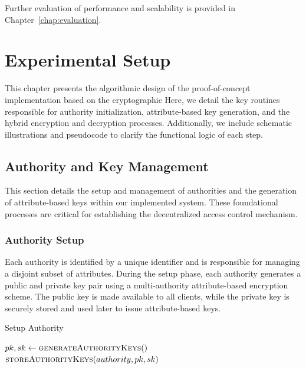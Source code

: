 \documentclass[cic,tc,english]{iiufrgs}
\begin{document}
            Further evaluation of performance and scalability is provided in Chapter~\ref{chap:evaluation}.


\chapter{Experimental Setup}
\label{chap:experimentalsetup}

    This chapter presents the algorithmic design of the proof-of-concept implementation based on the cryptographic Here, we detail the key routines responsible for authority initialization, attribute-based key generation, and the hybrid encryption and decryption processes. Additionally, we include schematic illustrations and pseudocode to clarify the functional logic of each step.

    \section{Authority and Key Management}
    \label{sec:authority-key-management}

        This section details the setup and management of authorities and the generation of attribute-based keys within our implemented system. These foundational processes are critical for establishing the decentralized access control mechanism.

        \subsection{Authority Setup}

            Each authority is identified by a unique identifier and is responsible for managing a disjoint subset of attributes. During the setup phase, each authority generates a public and private key pair using a multi-authority attribute-based encryption scheme. The public key is made available to all clients, while the private key is securely stored and used later to issue attribute-based keys.

            \begin{algorithm}
                \caption{Setup Authority}
                \label{alg:setup_authority}
                \begin{algorithmic}[1]
                    \State $pk, sk \gets \textsc{generateAuthorityKeys}()$
                    \State $\textsc{storeAuthorityKeys}(authority, pk, sk)$
                \EndProcedure
                \end{algorithmic}
            \end{algorithm}
\end{document}
